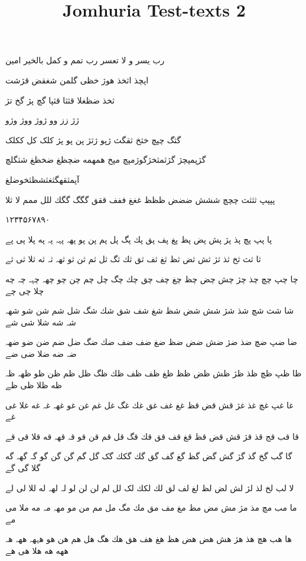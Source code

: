 \documentclass[a4paper]{article}
\title{Jomhuria Test-texts 2}
\begin{document}
\pagecolor{pagecolor}
\color{textcolor}

\begin{english}\maketitle\end{english}
\newpage

\begin{flushright}

\huge

رب یسر و لا تعسر رب تمم و کمل بالخیر امین

اپچذ اثخذ هوژ خظی گلمن شغقض قژشت

ثخذ ضظغلا قثثا قثپا گچ پژ گخ تژ

 ژژ زز وو ژوژ ووژ وژو

گثگ چپچ خثخ ثقگث ژپو ژثژ پن پو پژ کلک کل ککلک

گژپمپچژ گژثمثخژگوژمپچ مپخ همهمه ضچظغ ضخظغ شثگلچ

آپمثقهگثغثشظثخوضلغ

پپپپ ثثثث چچچ ششش ضضض ظظظ غغغ ففف ققق گگگ گگك للل ممم لا ثلا

۱۲۳۴۵۶۷۸۹۰

پا پپ پچ پذ پژ پش پض پظ پغ پف پق پك پگ پل پم پن پو پهہ پہہ پہ په پلا پی پے

ثا ثث ثخ ثذ ثژ ثش ثض ثظ ثغ ثف ثق ثك ثگ ثل ثم ثن ثو ثهہ ثہ ثه ثلا ثی ثے

چا چپ چچ چذ چژ چش چض چظ چغ چف چق چك چگ چل چم چن چو چهہ چہہ چہ چه چلا چی چے

شا شث شچ شذ شژ شش شض شظ شغ شف شق شك شگ شل شم شن شو شهہ شہ شه شلا شی شے

ضا ضپ ضچ ضذ ضژ ضش ضض ضظ ضغ ضف ضف ضك ضگ ضل ضم ضن ضو ضهہ ضہ ضه ضلا ضی ضے

ظا ظپ ظچ ظذ ظژ ظش ظض ظظ ظغ ظف ظف ظك ظگ ظل ظم ظن ظو ظهہ ظہ ظه ظلا ظی ظے

غا غپ غچ غذ غژ قش قض قظ غغ غف غق غك غگ غل غم غن غو غهہ غہ غه غلا غی غے

قا قب قج قذ قژ قش قض قظ قغ قف قق قك قگ قل قم قن قو قہ قهہ قه قلا قی قے

گا گب گخ گذ گژ گش گض گظ گغ گف گق گك گکك گک گل گم گن گن گو گہ گهہ گه گلا گی گے

لا لب لخ لذ لژ لش لض لظ لغ لف لق لك لکك لک لل لم لن لن لو لہ لهہ له للا لی لے

ما مب مچ مذ مژ مش مض مظ مغ مف مق مك مگ مل مم من مو مهہ مہ مه ملا می مے

ها هب هچ هذ هژ هش هض هض هظ هغ هف هق هك هگ هل هم هن هو هہهہ ههہ هہ ههه هه هلا هی هے


\end{flushright}
\end{document}
